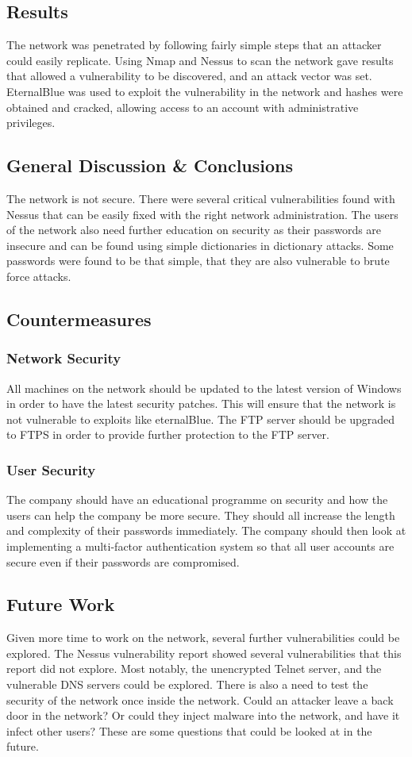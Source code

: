 \documentclass[12pt,a4paper]{article}
\begin{document}
		\subsection{Results}
			The network was penetrated by following fairly simple steps that an attacker could easily replicate. Using Nmap and Nessus to scan the network gave results that allowed a vulnerability to be discovered, and an attack vector was set. EternalBlue was used to exploit the vulnerability in the network and hashes were obtained and cracked, allowing access to an account with administrative privileges.
		\subsection{General Discussion \& Conclusions}
			The network is not secure. There were several critical vulnerabilities found with Nessus that can be easily fixed with the right network administration. The users of the network also need further education on security as their passwords are insecure and can be found using simple dictionaries in dictionary attacks. Some passwords were found to be that simple, that they are also vulnerable to brute force attacks.
		\subsection{Countermeasures}
			\subsubsection{Network Security}
				All machines on the network should be updated to the latest version of Windows in order to have the latest security patches. This will ensure that the network is not vulnerable to exploits like eternalBlue. The \acrshort{FTP} server should be upgraded to \acrshort{FTPS} in order to provide further protection to the \acrshort{FTP} server.
			\subsubsection{User Security}
				The company should have an educational programme on security and how the users can help the company be more secure. They should all increase the length and complexity of their passwords immediately. The company should then look at implementing a multi-factor authentication system so that all user accounts are secure even if their passwords are compromised.

		\subsection{Future Work}
		Given more time to work on the network, several further vulnerabilities could be explored. The Nessus vulnerability report showed several vulnerabilities that this report did not explore. Most notably, the unencrypted Telnet server, and the vulnerable \acrshort{DNS} servers could be explored. There is also a need to test the security of the network once inside the network. Could an attacker leave a back door in the network? Or could they inject malware into the network, and have it infect other users? These are some questions that could be looked at in the future.
\end{document}
